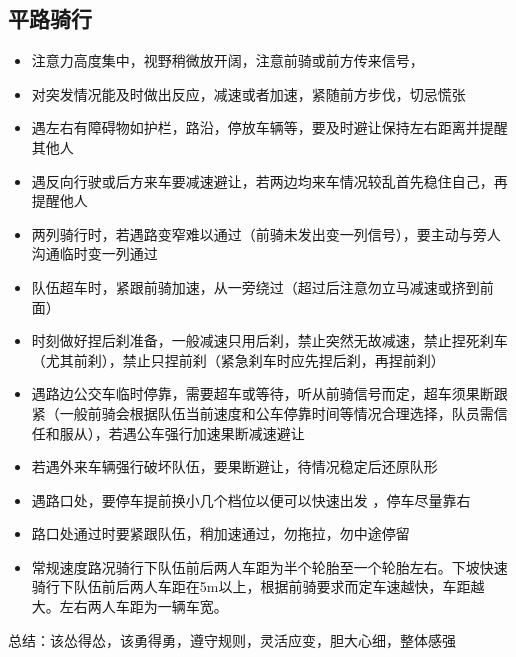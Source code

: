 \documentclass{ctexbook}
\begin{document}
\subsection{平路骑行}
\begin{itemize}

    \item 注意力高度集中，视野稍微放开阔，注意前骑或前方传来信号，

    \item 对突发情况能及时做出反应，减速或者加速，紧随前方步伐，切忌慌张

    \item 遇左右有障碍物如护栏，路沿，停放车辆等，要及时避让保持左右距离并提醒其他人

    \item 遇反向行驶或后方来车要减速避让，若两边均来车情况较乱首先稳住自己，再提醒他人 

    \item 两列骑行时，若遇路变窄难以通过（前骑未发出变一列信号），要主动与旁人沟通临时变一列通过

    \item 队伍超车时，紧跟前骑加速，从一旁绕过（超过后注意勿立马减速或挤到前面）

    \item 时刻做好捏后刹准备，一般减速只用后刹，禁止突然无故减速，禁止捏死刹车（尤其前刹），禁止只捏前刹（紧急刹车时应先捏后刹，再捏前刹）

    \item 遇路边公交车临时停靠，需要超车或等待，听从前骑信号而定，超车须果断跟紧（一般前骑会根据队伍当前速度和公车停靠时间等情况合理选择，队员需信任和服从），若遇公车强行加速果断减速避让

    \item 若遇外来车辆强行破坏队伍，要果断避让，待情况稳定后还原队形

    \item 遇路口处，要停车提前换小几个档位以便可以快速出发 ，停车尽量靠右

    \item 路口处通过时要紧跟队伍，稍加速通过，勿拖拉，勿中途停留

    \item 常规速度路况骑行下队伍前后两人车距为半个轮胎至一个轮胎左右。下坡快速骑行下队伍前后两人车距在5m以上，根据前骑要求而定车速越快，车距越大。左右两人车距为一辆车宽。
\end{itemize}
总结：该怂得怂，该勇得勇，遵守规则，灵活应变，胆大心细，整体感强
\end{document}
